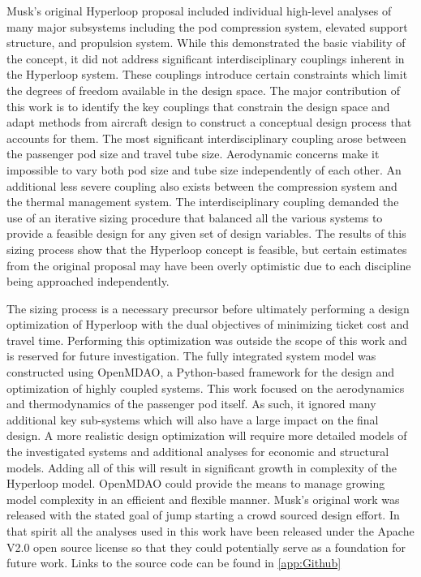 \documentclass[heading.tex]{subfiles}
\begin{document}
Musk's original Hyperloop proposal included individual high-level analyses of many major subsystems including the pod compression system,
elevated support structure, and propulsion system. While this demonstrated the basic viability of the concept, it did not address
significant interdisciplinary couplings inherent in the Hyperloop system. These couplings introduce certain constraints which limit the 
degrees of freedom available in the design space. The major contribution of this work is to identify the key couplings that constrain the design space
and adapt methods from aircraft design to construct a conceptual design process that accounts for them. The most significant 
interdisciplinary coupling arose between the passenger pod size and travel tube size. Aerodynamic concerns make it impossible to vary 
both pod size and tube size independently of each other. An additional less severe coupling also exists between the compression system and 
the thermal management system. The interdisciplinary coupling demanded the use of an iterative sizing procedure that balanced 
all the various systems to provide a feasible design for any given set of design variables. The results of this sizing process show that
the Hyperloop concept is feasible, but certain estimates from the original proposal may have been overly optimistic due to each discipline being approached independently. 

The sizing process is a necessary precursor before ultimately performing a design optimization of 
Hyperloop with the dual objectives of minimizing ticket cost and travel time. Performing this optimization 
was outside the scope of this work and is reserved for future investigation. 
The fully integrated system model was constructed using OpenMDAO, a Python-based framework for 
the design and optimization of highly coupled systems\cite{GrayBenchmarking2013}. 
This work focused on the aerodynamics and thermodynamics of the passenger pod itself.
As such, it ignored many additional key sub-systems which will also have a large impact on the final design.
A more realistic design optimization will require more detailed models of the investigated systems and additional analyses for economic and 
structural models. Adding all of this will result in significant growth in complexity of the Hyperloop model. 
OpenMDAO could provide the means to manage growing model complexity 
in an efficient and flexible manner. Musk's original work was released with the stated goal of jump starting
a crowd sourced design effort. In that spirit all the analyses used in this work have been released under
the Apache V2.0 open source license so that they could potentially serve as a foundation for future work. 
Links to the source code can be found in \cref{app:Github}
\end{document}

